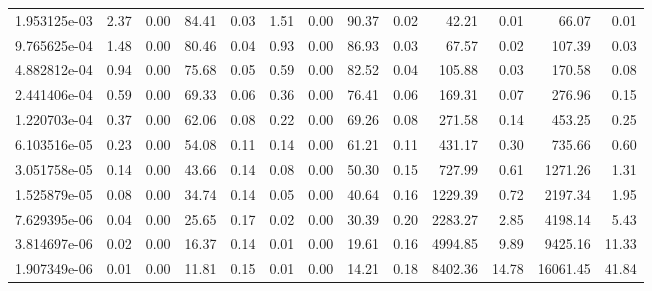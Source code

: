 \begin{tabular}{lrrrrrrrrrrrr}
1.953125e-03 &        2.37 &        0.00 &         84.41 &          0.03 &           1.51 &           0.00 &        90.37 &         0.02 &            42.21 &             0.01 &           66.07 &            0.01 \\
9.765625e-04 &        1.48 &        0.00 &         80.46 &          0.04 &           0.93 &           0.00 &        86.93 &         0.03 &            67.57 &             0.02 &          107.39 &            0.03 \\
4.882812e-04 &        0.94 &        0.00 &         75.68 &          0.05 &           0.59 &           0.00 &        82.52 &         0.04 &           105.88 &             0.03 &          170.58 &            0.08 \\
2.441406e-04 &        0.59 &        0.00 &         69.33 &          0.06 &           0.36 &           0.00 &        76.41 &         0.06 &           169.31 &             0.07 &          276.96 &            0.15 \\
1.220703e-04 &        0.37 &        0.00 &         62.06 &          0.08 &           0.22 &           0.00 &        69.26 &         0.08 &           271.58 &             0.14 &          453.25 &            0.25 \\
6.103516e-05 &        0.23 &        0.00 &         54.08 &          0.11 &           0.14 &           0.00 &        61.21 &         0.11 &           431.17 &             0.30 &          735.66 &            0.60 \\
3.051758e-05 &        0.14 &        0.00 &         43.66 &          0.14 &           0.08 &           0.00 &        50.30 &         0.15 &           727.99 &             0.61 &         1271.26 &            1.31 \\
1.525879e-05 &        0.08 &        0.00 &         34.74 &          0.14 &           0.05 &           0.00 &        40.64 &         0.16 &          1229.39 &             0.72 &         2197.34 &            1.95 \\
7.629395e-06 &        0.04 &        0.00 &         25.65 &          0.17 &           0.02 &           0.00 &        30.39 &         0.20 &          2283.27 &             2.85 &         4198.14 &            5.43 \\
3.814697e-06 &        0.02 &        0.00 &         16.37 &          0.14 &           0.01 &           0.00 &        19.61 &         0.16 &          4994.85 &             9.89 &         9425.16 &           11.33 \\
1.907349e-06 &        0.01 &        0.00 &         11.81 &          0.15 &           0.01 &           0.00 &        14.21 &         0.18 &          8402.36 &            14.78 &        16061.45 &           41.84 \\

\end{tabular}
